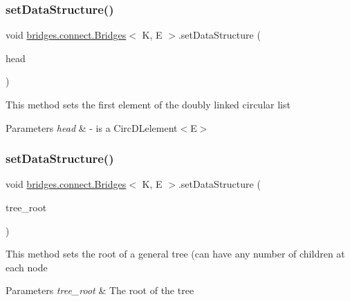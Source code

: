 \subsubsection{\texorpdfstring{set\+Data\+Structure()}{setDataStructure()}\hspace{0.1cm}{\footnotesize\ttfamily [6/12]}}
{\footnotesize\ttfamily void \hyperlink{classbridges_1_1connect_1_1_bridges}{bridges.\+connect.\+Bridges}$<$ K, E $>$.set\+Data\+Structure (\begin{DoxyParamCaption}\item[{\hyperlink{classbridges_1_1base_1_1_circ_d_lelement}{Circ\+D\+Lelement}$<$ E $>$}]{head }\end{DoxyParamCaption})}

This method sets the first element of the doubly linked circular list


\begin{DoxyParams}{Parameters}
{\em head} & -\/ is a Circ\+D\+Lelement$<$\+E$>$ \\
\hline
\end{DoxyParams}
\hypertarget{classbridges_1_1connect_1_1_bridges_a0788905a16b9a8f3deb0b4a344f2b42d}{}\label{classbridges_1_1connect_1_1_bridges_a0788905a16b9a8f3deb0b4a344f2b42d} 
\subsubsection{\texorpdfstring{set\+Data\+Structure()}{setDataStructure()}\hspace{0.1cm}{\footnotesize\ttfamily [7/12]}}
{\footnotesize\ttfamily void \hyperlink{classbridges_1_1connect_1_1_bridges}{bridges.\+connect.\+Bridges}$<$ K, E $>$.set\+Data\+Structure (\begin{DoxyParamCaption}\item[{\hyperlink{classbridges_1_1base_1_1_tree_element}{Tree\+Element}$<$ E $>$}]{tree\+\_\+root }\end{DoxyParamCaption})}

This method sets the root of a general tree (can have any number of children at each node


\begin{DoxyParams}{Parameters}
{\em tree\+\_\+root} & The root of the tree \\
\hline
\end{DoxyParams}
\hypertarget{classbridges_1_1connect_1_1_bridges_a02a3d74b381473b5d97a8f8194df9b40}{}\label{classbridges_1_1connect_1_1_bridges_a02a3d74b381473b5d97a8f8194df9b40} 
